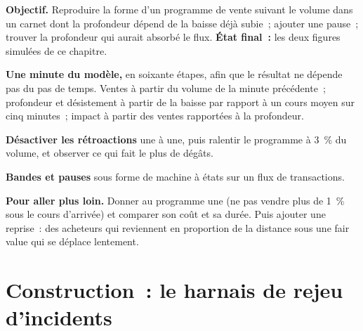 \begin{tutorial}
\textbf{Objectif.} Reproduire la forme d'un programme de vente suivant le volume dans un
carnet dont la profondeur dépend de la baisse déjà subie~; ajouter une pause~; trouver la
profondeur qui aurait absorbé le flux. \textbf{État final~:} les deux figures simulées de
ce chapitre.
\begin{tutsteps}
\item \textbf{Une minute du modèle,} en soixante étapes, afin que le résultat ne dépende
pas du pas de temps. Ventes à partir du volume de la minute précédente~; profondeur et
désistement à partir de la baisse par rapport à un cours moyen sur cinq minutes~; impact à
partir des ventes rapportées à la profondeur.
\label{lst:m1:stress-case-studies:run}
\item \textbf{Désactiver les rétroactions} une à une, puis ralentir le programme à 3~\% du
volume, et observer ce qui fait le plus de dégâts.
\item \textbf{Bandes et pauses} sous forme de machine à états sur un flux de transactions.
\label{lst:m1:stress-case-studies:luld}
\end{tutsteps}
\textbf{Pour aller plus loin.} Donner au programme une  (ne pas
vendre plus de 1~\% sous le cours d'arrivée) et comparer son coût et sa durée.
Puis ajouter une reprise~: des acheteurs qui reviennent en proportion de la distance sous une
fair value qui se déplace lentement.
\end{tutorial}

\section{Construction~: le harnais de rejeu d'incidents}\label{bld:m1:stress-case-studies:replay}

